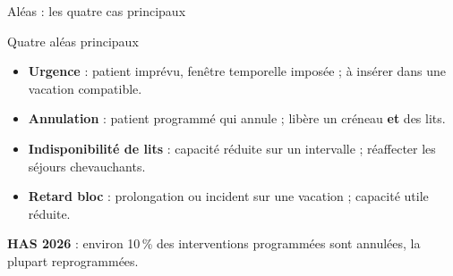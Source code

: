 \begin{frame}{Aléas : les quatre cas principaux}
  \scriptsize
  \begin{block}{Quatre aléas principaux}
    \begin{itemize}
      \item \textbf{Urgence} : patient imprévu, fenêtre temporelle imposée ;
        à insérer dans une vacation compatible.
      \item \textbf{Annulation} : patient programmé qui annule ; libère un
        créneau \textbf{et} des lits.
      \item \textbf{Indisponibilité de lits} : capacité réduite sur un
        intervalle ; réaffecter les séjours chevauchants.
      \item \textbf{Retard bloc} : prolongation ou incident sur une
        vacation ; capacité utile réduite.
    \end{itemize}
  \end{block}

  \par\vspace{0.04cm}
  {\footnotesize \textbf{HAS 2026} : environ 10\,\% des interventions
    programmées sont annulées, la plupart reprogrammées.}

\end{frame}

